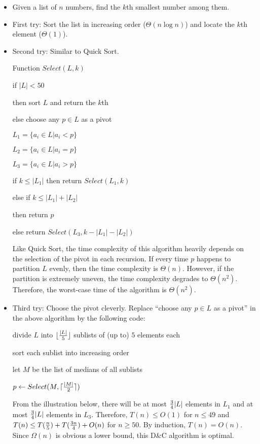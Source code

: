 \documentclass{article}
\begin{document}
\begin{itemize}

\item Given a list of $n$ numbers, find the $k$th smallest number
among them.

\item First try: Sort the list in increasing order ($\Theta(n\log n)$)
and locate the $k$th element ($\Theta(1)$).

\item Second try: Similar to Quick Sort.
 
Function $Select(L,k)$

\qquad if $|L|<50$

\qquad then sort $L$ and return the $k$th

\qquad else choose any $p\in L$ as a pivot

\qquad\qquad $L_1=\{a_i\in L|a_i<p\}$

\qquad\qquad $L_2=\{a_i\in L|a_i=p\}$

\qquad\qquad $L_3=\{a_i\in L|a_i>p\}$

\qquad\qquad if $k\le |L_1|$ then return $Select(L_1,k)$

\qquad\qquad else if $k\le |L_1|+|L_2|$

\qquad\qquad\qquad then return $p$

\qquad\qquad\qquad else return $Select(L_3,k-|L_1|-|L_2|)$

Like Quick Sort, the time complexity of this algorithm heavily
depends on the selection of the pivot in each recursion.
If every time $p$ happens to partition $L$ evenly, then the
time complexity is $\Theta(n)$. However, if the partition is
extremely uneven, the time complexity degrades to $\Theta(n^2)$.
Therefore, the worst-case time of the algorithm is $\Theta(n^2)$.

\item Third try: Choose the pivot cleverly. Replace
``choose any $p\in L$ as a pivot'' in the above algorithm by the
following code:

\qquad\qquad divide $L$ into $\lfloor {|L|\over5}\rfloor$
sublists of (up to) $5$ elements each

\qquad\qquad sort each sublist into increasing order

\qquad\qquad let $M$ be the list of medians of all sublists

\qquad\qquad $p\leftarrow Select(M, \lceil {|M|\over2}\rceil)$

From the illustration below, there will be at most ${3\over4}|L|$
elements in $L_1$ and at most ${3\over4}|L|$ elements in $L_3$.
Therefore, $T(n)\le O(1)$ for $n\le49$ and 
$T(n)\le T({n\over5})+T({3n\over4})+O(n)$ for $n\ge 50$. By induction,
$T(n)=O(n)$. Since $\Omega(n)$ is obvious a lower bound, this
D\&C algorithm is optimal.


\end{itemize}
\end{document}

